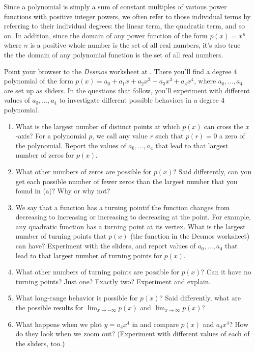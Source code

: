 \documentclass{ximera}
\begin{document}
Since a polynomial is simply a sum of constant multiples of various power functions with positive integer powers, we often refer to those individual terms by referring to their individual degrees:  the linear term, the quadratic term, and so on.  In addition, since the domain of any power function of the form $p(x) = x^n$ where $n$ is a positive whole number is the set of all real numbers, it's also true the the domain of any polynomial function is the set of all real numbers.%
\begin{exploration}
Point your browser to the \emph{Desmos} worksheet at .  There you'll find a degree $4$ polynomial of the form $p(x) = a_0 + a_1x + a_2x^2 + a_3x^3 + a_4x^4$, where $a_0, \ldots, a_4$ are set up as sliders.  In the questions that follow, you'll experiment with different values of $a_0, \ldots, a_4$ to investigate different possible behaviors in a degree $4$ polynomial.%
\begin{enumerate}
\item What is the largest number of distinct points at which $p(x)$ can cross the $x$-axis?%
For a polynomial $p$, we call any value $r$ such that $p(r) = 0$ a zero of the polynomial.  Report the values of $a_0, \ldots, a_4$ that lead to that largest number of zeros for $p(x)$.%
\item What other numbers of zeros are possible for $p(x)$?  Said differently, can you get each possible number of fewer zeros than the largest number that you found in (a)? Why or why not?
\item We say that a function has a turning pointif the function changes from decreasing to increasing or increasing to decreasing at the point.  For example, any quadratic function has a turning point at its vertex.%
What is the largest number of turning points that $p(x)$ (the function in the Desmos worksheet) can have?  Experiment with the sliders, and report values of $a_0, \ldots, a_4$ that lead to that largest number of turning points for $p(x)$.%
\item What other numbers of turning points are possible for $p(x)$? Can it have no turning points?  Just one?  Exactly two? Experiment and explain.%
\item What long-range behavior is possible for $p(x)$?  Said differently, what are the possible results for $\displaystyle \lim_{x \to -\infty} p(x)$ and $\displaystyle \lim_{x \to \infty} p(x)$?%
\item What happens when we plot $y = a_4 x^4$ in and compare $p(x)$ and $a_4 x^4$?  How do they look when we zoom out? (Experiment with different values of each of the sliders, too.)
\end{enumerate}
\end{exploration}
\end{document}
